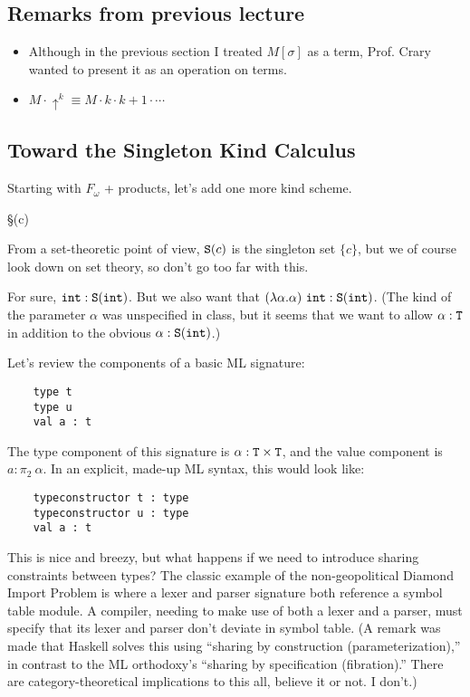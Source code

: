 
\subsection{Remarks from previous lecture}
\begin{itemize}
  \item Although in the previous section I treated $M[\sigma]$ as a term, Prof\@. Crary
    wanted to present it as an operation on terms.
  \item $M \cdot \uparrow^k \equiv M \cdot k \cdot k+1 \cdot \cdots$
\end{itemize}

\subsection{Toward the Singleton Kind Calculus}
Starting with $F_\omega$ + products, let's add one more kind scheme.
\begin{bnf}
  \kappa \bnfeq \T
  \alt \kappa \to \kappa
  \alt \kappa \times \kappa
  \alt \S(c)
\end{bnf}
From a set-theoretic point of view, $\S(c)$ is the singleton set $\{ c \}$, but we of
course look down on set theory, so don't go too far with this.

For sure, $\int : \S(\int)$. But we also want that $(\lambda \alpha. \alpha)~\int : \S(\int)$.
(The kind of the parameter $\alpha$ was unspecified in class, but it seems that we want
to allow $\alpha : \T$ in addition to the obvious $\alpha : \S(\int)$.)

Let's review the components of a basic ML signature:
\begin{verbatim}
    type t
    type u
    val a : t
\end{verbatim}
The type component of this signature is $\alpha : \T \times \T$, and the value component
is $a : \pi_2~\alpha$. In an explicit, made-up ML syntax, this would look like:
\begin{verbatim}
    typeconstructor t : type
    typeconstructor u : type
    val a : t
\end{verbatim}

This is nice and breezy, but what happens if we need to introduce sharing constraints
between types? The classic example of the non-geopolitical Diamond Import Problem is where
a lexer and parser signature both reference a symbol table module.
A compiler, needing to make use of both a lexer and a parser, must specify that its lexer
and parser don't deviate in symbol table.
(A remark was made that Haskell solves this using ``sharing by construction (parameterization),''
in contrast to the ML orthodoxy's ``sharing by specification (fibration).''
There are category-theoretical implications to this all, believe it or not. I don't.)

